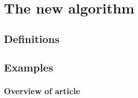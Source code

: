 \chapter{The new algorithm}




\section{Definitions}




\section{Examples}

% 
% 
% 
% 

\subsection{Overview of article}

